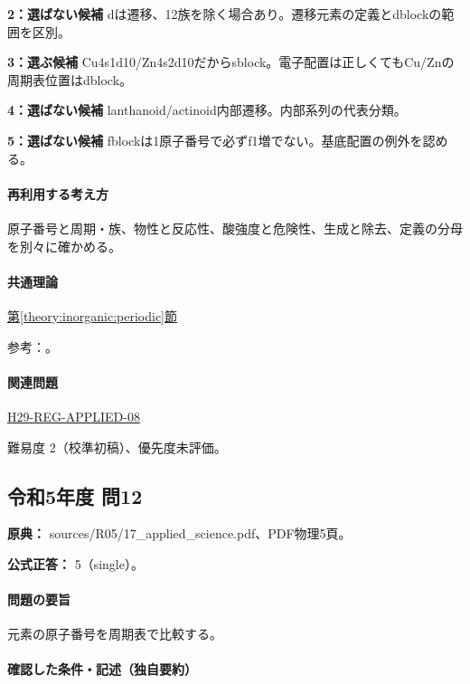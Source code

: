 \noindent\textbf{2：選ばない候補} dは遷移、12族を除く場合あり。遷移元素の定義とdblockの範囲を区別。\par

\noindent\textbf{3：選ぶ候補} Cu4s1d10/Zn4s2d10だからsblock。電子配置は正しくてもCu/Znの周期表位置はdblock。\par

\noindent\textbf{4：選ばない候補} lanthanoid/actinoid内部遷移。内部系列の代表分類。\par

\noindent\textbf{5：選ばない候補} fblockは1原子番号で必ずf1増でない。基底配置の例外を認める。\par

\paragraph{再利用する考え方} 原子番号と周期・族、物性と反応性、酸強度と危険性、生成と除去、定義の分母を別々に確かめる。

\paragraph{共通理論} \hyperref[theory:inorganic:periodic]{第\ref*{theory:inorganic:periodic}節}

\par 参考：\cite{atomic_nist2019}。

\paragraph{関連問題} \hyperref[q:h29-reg-applied-08]{H29-REG-APPLIED-08}

\par 難易度 2（校準初稿）、優先度未評価。

\subsection{令和5年度 問12}
\label{q:r05-reg-applied-12}

\noindent\textbf{原典：} sources/R05/17\_applied\_science.pdf、PDF物理5頁。

\textbf{公式正答：} 5（single）。

\paragraph{問題の要旨} 元素の原子番号を周期表で比較する。

\paragraph{確認した条件・記述（独自要約）}\mbox{}\par

